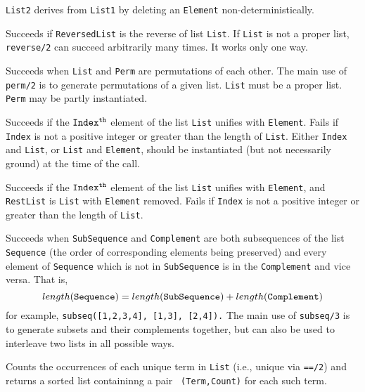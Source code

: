 \begin{description}
 {\tt List2}
derives from {\tt List1} by deleting an {\tt Element}
non-deterministically.

    Succeeds if {\tt ReversedList} is the reverse of list {\tt List}.
    If {\tt List} is not a proper list, {\tt reverse/2} can succeed
    arbitrarily many times.  It works only one way.

    Succeeds when {\tt List} and {\tt Perm} are permutations of each
    other.  The main use of {\tt perm/2} is to generate permutations
    of a given list.  {\tt List} must be a proper list.
    {\tt Perm} may be partly instantiated.

    Succeeds if the ${\tt Index^{th}}$ element of the list {\tt List} 
    unifies with {\tt Element}.  Fails if {\tt Index} is not a positive
    integer or greater than the length of {\tt List}.
    Either {\tt Index} and {\tt List}, or {\tt List} and {\tt Element}, 
    should be instantiated (but not necessarily ground) at the time of 
    the call.

    Succeeds if the ${\tt Index^{th}}$ element of the list {\tt List}
    unifies with {\tt Element}, and {\tt RestList} is {\tt List} with
    {\tt Element} removed.  Fails if {\tt Index} is not a positive
    integer or greater than the length of {\tt List}.

    Succeeds when {\tt SubSequence} and {\tt Complement} are both
    subsequences of the list {\tt Sequence} (the order of corresponding
    elements being preserved) and every element of {\tt Sequence} which
    is not in {\tt SubSequence} is in the {\tt Complement} and vice
    versa.  That is,
    \[ length({\tt Sequence}) =
                length({\tt SubSequence})+length({\tt Complement}) \]
    for example, {\tt subseq([1,2,3,4], [1,3], [2,4]).}
    The main use of {\tt subseq/3} is to generate subsets and their
    complements together, but can also be used to interleave two lists
    in all possible ways.

%
Counts the occurrences of each unique term in {\tt List} (i.e., unique
via {\tt ==/2}) and returns a sorted list containinng a pair {\tt
  (Term,Count)} for each such term.


\end{description}
